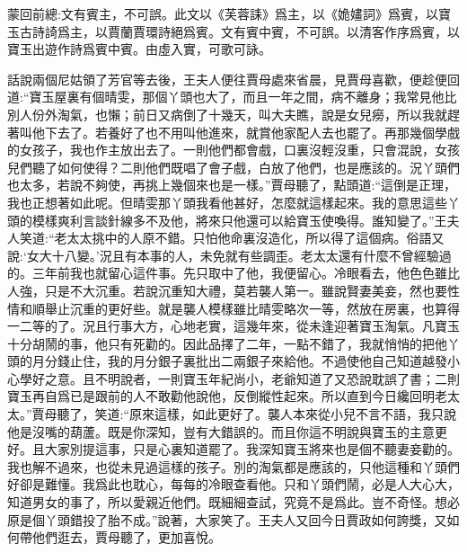 

\begin{parag}
    \begin{note}蒙回前總:文有賓主，不可誤。此文以《芙蓉誄》爲主，以《姽嫿詞》爲賓，以寶玉古詩䛴爲主，以賈蘭賈環詩絕爲賓。文有賓中賓，不可誤。以清客作序爲賓，以寶玉出遊作詩爲賓中賓。由虛入實，可歌可詠。\end{note}
\end{parag}


\begin{parag}
    話說兩個尼姑領了芳官等去後，王夫人便往賈母處來省晨，見賈母喜歡，便趁便回道:“寶玉屋裏有個晴雯，那個丫頭也大了，而且一年之間，病不離身；我常見他比別人份外淘氣，也懶；前日又病倒了十幾天，叫大夫瞧，說是女兒癆，所以我就趕著叫他下去了。若養好了也不用叫他進來，就賞他家配人去也罷了。再那幾個學戲的女孩子，我也作主放出去了。一則他們都會戲，口裏沒輕沒重，只會混說，女孩兒們聽了如何使得？二則他們既唱了會子戲，白放了他們，也是應該的。況丫頭們也太多，若說不夠使，再挑上幾個來也是一樣。”賈母聽了，點頭道:“這倒是正理，我也正想著如此呢。但晴雯那丫頭我看他甚好，怎麼就這樣起來。我的意思這些丫頭的模樣爽利言談針線多不及他，將來只他還可以給寶玉使喚得。誰知變了。”王夫人笑道:“老太太挑中的人原不錯。只怕他命裏沒造化，所以得了這個病。俗語又說:‘女大十八變。’況且有本事的人，未免就有些調歪。老太太還有什麼不曾經驗過的。三年前我也就留心這件事。先只取中了他，我便留心。冷眼看去，他色色雖比人強，只是不大沉重。若說沉重知大禮，莫若襲人第一。雖說賢妻美妾，然也要性情和順舉止沉重的更好些。就是襲人模樣雖比晴雯略次一等，然放在房裏，也算得一二等的了。況且行事大方，心地老實，這幾年來，從未逢迎著寶玉淘氣。凡寶玉十分胡鬧的事，他只有死勸的。因此品擇了二年，一點不錯了，我就悄悄的把他丫頭的月分錢止住，我的月分銀子裏批出二兩銀子來給他。不過使他自己知道越發小心學好之意。且不明說者，一則寶玉年紀尚小，老爺知道了又恐說耽誤了書；二則寶玉再自爲已是跟前的人不敢勸他說他，反倒縱性起來。所以直到今日纔回明老太太。”賈母聽了，笑道:“原來這樣，如此更好了。襲人本來從小兒不言不語，我只說他是沒嘴的葫蘆。既是你深知，豈有大錯誤的。而且你這不明說與寶玉的主意更好。且大家別提這事，只是心裏知道罷了。我深知寶玉將來也是個不聽妻妾勸的。我也解不過來，也從未見過這樣的孩子。別的淘氣都是應該的，只他這種和丫頭們好卻是難懂。我爲此也耽心，每每的冷眼查看他。只和丫頭們鬧，必是人大心大，知道男女的事了，所以愛親近他們。既細細查試，究竟不是爲此。豈不奇怪。想必原是個丫頭錯投了胎不成。”說著，大家笑了。王夫人又回今日賈政如何誇獎，又如何帶他們逛去，賈母聽了，更加喜悅。
\end{parag}


